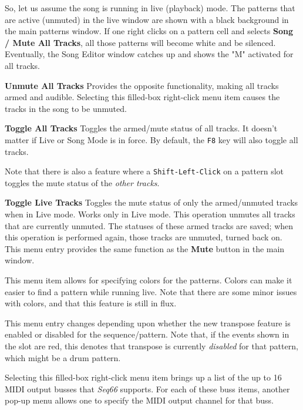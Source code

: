    So, let us assume the song is running in live (playback) mode.
   The patterns that are active (unmuted) in the live window are shown with a
   black background in the main patterns window.  If one right clicks on a
   pattern cell and selects \textbf{Song / Mute All Tracks}, all those patterns
   will become white and be silenced.  Eventually, the Song Editor window
   catches up and shows the "M" activated for all tracks.

   \textbf{Unmute All Tracks}
   Provides the opposite functionality, making all tracks armed and audible.
   Selecting this filled-box right-click menu item causes
   the tracks in the song to be unmuted.

   \textbf{Toggle All Tracks}
   Toggles the armed/mute status of all tracks.
   It doesn't matter if Live or Song Mode is in force.
   By default, the \texttt{F8} key will also toggle all tracks.

   Note that there is also a feature where a
   \texttt{Shift-Left-Click} on a pattern slot toggles the mute
   status of the \textsl{other tracks}.

   \textbf{Toggle Live Tracks}
   Toggles the mute status of only the armed/unmuted tracks when in Live mode.
   Works only in Live mode.  This operation unmutes all tracks that are
   currently unmuted.  The statuses of these armed tracks are saved; when
   this operation is performed again, those tracks are unmuted, turned back on.
   This menu entry provides the same function as the \textbf{Mute}
   button in the main window.

   This menu item allows for specifying colors for the patterns.
   Colors can make it easier to find a pattern while running live.
   Note that there are some minor issues with colors, and that this feature is
   still in flux.

   This menu entry changes depending upon whether the new transpose feature is
   enabled or disabled for the sequence/pattern.  Note that, if the events
   shown in the slot are red, this denotes that transpose is currently
   \textsl{disabled} for that pattern, which might be a drum pattern.

   Selecting this filled-box right-click menu item brings up a list
   of the up to 16 MIDI output busses that \textsl{Seq66} supports.
   For each of these buss items, another pop-up menu allows one
   to specify the MIDI output channel for that buss.

